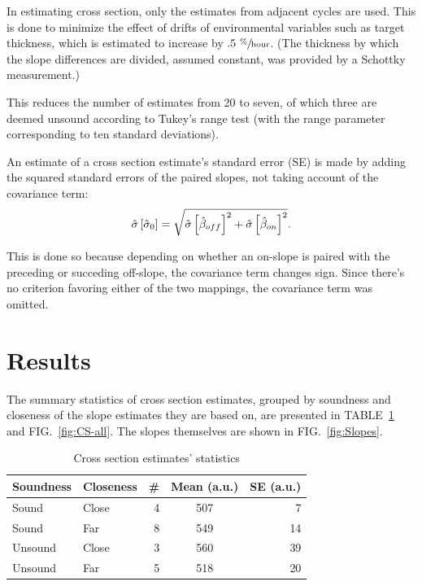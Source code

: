 \documentclass[reprint]{revtex4-1}
\begin{document}
In estimating cross section, only the estimates from adjacent cycles are used. This is done to minimize the effect of drifts of environmental variables such as target thickness, which is estimated to increase by $.5~ \sfrac{\%}{\mathrm{hour}}$. (The thickness by which the slope differences are divided, assumed constant, was provided by a Schottky measurement.)

This reduces the number of estimates from 20 to seven, of which three are deemed unsound according to Tukey's range test (with the range parameter corresponding to ten standard deviations). 

An estimate of a cross section estimate's standard error (SE) is made by adding the squared standard errors of the paired slopes, not taking account of the covariance term:
\begin{equation}
	\SE*{\CS*[0]} = \sqrt{\SE*{\slp*[off]}^2 + \SE*{\slp*[on]}^2}.
\end{equation}

This is done so because depending on whether an on-slope is paired with the preceding or succeding off-slope, the covariance term changes sign. Since there's no criterion favoring either of the two mappings, the covariance term was omitted.


\section{Results}

The summary statistics of cross section estimates, grouped by soundness and closeness of the slope estimates they are based on, are presented in TABLE~\ref{tbl:CS-all} and FIG.~\ref{fig:CS-all}. The slopes themselves are shown in FIG.~\ref{fig:Slopes}.

\begin{table}
\centering
\caption{Cross section estimates' statistics\label{tbl:CS-all}}
\begin{tabular}{llrcr}
\hline\hline
Soundness	& Closeness		& \#		& Mean (a.u.)		& SE (a.u.) \\
\hline
Sound		& Close			& 4			& 507				& 7  \\
Sound		& Far			& 8			& 549				& 14 \\
Unsound		& Close			& 3			& 560				& 39 \\
Unsound		& Far			& 5			& 518				& 20 \\
\end{tabular}
\end{table}
\end{document}
